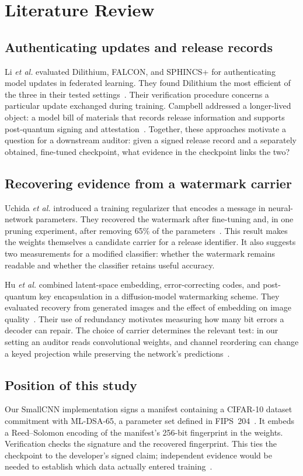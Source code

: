 \section{Literature Review}
\label{sec:related-work}

\subsection{Authenticating updates and release records}
Li \emph{et al.} evaluated Dilithium, FALCON, and SPHINCS+ for authenticating model updates in federated learning. They found Dilithium the most efficient of the three in their tested settings~\cite{li2024federated}. Their verification procedure concerns a particular update exchanged during training. Campbell addressed a longer-lived object: a model bill of materials that records release information and supports post-quantum signing and attestation~\cite{campbell2026mbom}. Together, these approaches motivate a question for a downstream auditor: given a signed release record and a separately obtained, fine-tuned checkpoint, what evidence in the checkpoint links the two?

\subsection{Recovering evidence from a watermark carrier}
Uchida \emph{et al.} introduced a training regularizer that encodes a message in neural-network parameters. They recovered the watermark after fine-tuning and, in one pruning experiment, after removing 65\% of the parameters~\cite{uchida2017embedding}. This result makes the weights themselves a candidate carrier for a release identifier. It also suggests two measurements for a modified classifier: whether the watermark remains readable and whether the classifier retains useful accuracy.

Hu \emph{et al.} combined latent-space embedding, error-correcting codes, and post-quantum key encapsulation in a diffusion-model watermarking scheme. They evaluated recovery from generated images and the effect of embedding on image quality~\cite{hu2026diffusion}. Their use of redundancy motivates measuring how many bit errors a decoder can repair. The choice of carrier determines the relevant test: in our setting an auditor reads convolutional weights, and channel reordering can change a keyed projection while preserving the network's predictions~\cite{projectResults}.

\subsection{Position of this study}
Our SmallCNN implementation signs a manifest containing a CIFAR-10 dataset commitment with ML-DSA-65, a parameter set defined in FIPS~204~\cite{nist204}. It embeds a Reed--Solomon encoding of the manifest's 256-bit fingerprint in the weights. Verification checks the signature and the recovered fingerprint. This ties the checkpoint to the developer's signed claim; independent evidence would be needed to establish which data actually entered training~\cite{projectResults}.

